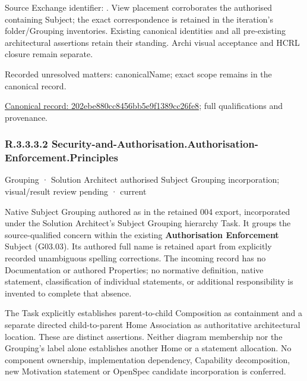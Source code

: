 Source Exchange identifier: \texttt{}. View placement corroborates
the authorised containing Subject; the exact correspondence is retained in the
iteration's folder/Grouping inventories. Existing canonical identities and all
pre-existing architectural assertions retain their standing. Archi visual
acceptance and HCRL closure remain separate.


{\small Recorded unresolved matters: canonicalName; exact scope remains in the canonical record.}\par
{\footnotesize \href{../../../../continuum/grouping/202ebe880cc8456bb5e9f1389cc26fe8.md}{Canonical record: 202ebe880cc8456bb5e9f1389cc26fe8}; full qualifications and provenance.}\par
\subsubsection*{R.3.3.3.2 Security-and-Authorisation.Authorisation-Enforcement.Principles}
\label{navigation:R.3.3.3.2}

\label{element:f85948e2b4e145a4b56ab369c1a70c22}
{\small Grouping · Solution Architect authorised Subject Grouping incorporation; visual/result review pending · current}\par

Native Subject Grouping authored as \texttt{} in the retained 004 export,
incorporated under the Solution Architect's Subject Grouping hierarchy Task.
It groups the source-qualified \texttt{} concern within
the existing \textbf{Authorisation Enforcement} Subject (G03.03). Its authored full name
is retained apart from explicitly recorded unambiguous spelling corrections.
The incoming record has no Documentation or authored Properties; no normative
definition, native statement, classification of individual statements, or
additional responsibility is invented to complete that absence.



The Task explicitly establishes parent-to-child Composition as containment and
a separate directed child-to-parent Home Association as authoritative architectural
location. These are distinct assertions. Neither diagram membership nor the
Grouping's label alone establishes another Home or a statement allocation.
No component ownership, implementation dependency, Capability decomposition,
new Motivation statement or OpenSpec candidate incorporation is conferred.



